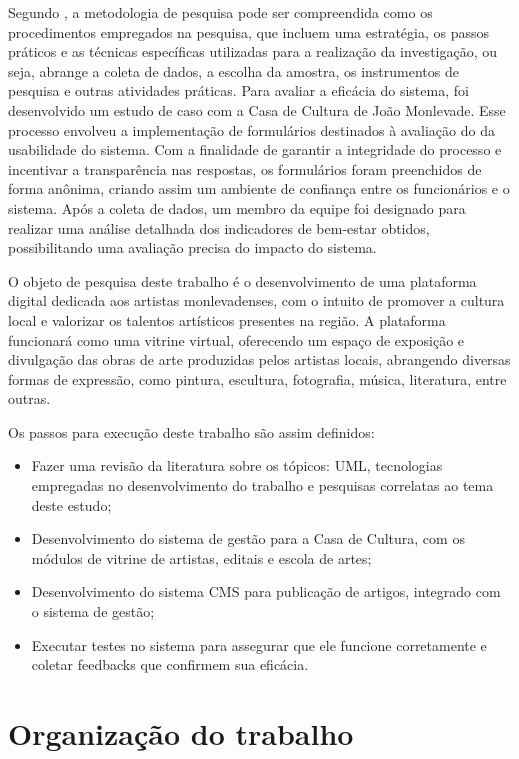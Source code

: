 Segundo \cite{moresi2003metodologia}, a metodologia de pesquisa pode ser compreendida como os procedimentos empregados na pesquisa, que incluem uma estratégia, os passos práticos e as técnicas específicas utilizadas para a realização da investigação, ou seja, abrange a coleta de dados, a escolha da amostra, os instrumentos de pesquisa e outras atividades práticas. Para avaliar a eficácia do sistema, foi desenvolvido um estudo de caso com a Casa de Cultura de João Monlevade. Esse processo envolveu a implementação de formulários destinados à avaliação do da usabilidade do sistema. Com a finalidade de garantir a integridade do processo e incentivar a transparência nas respostas, os formulários foram preenchidos de forma anônima, criando assim um ambiente de confiança entre os funcionários e o sistema. Após a coleta de dados, um membro da equipe foi designado para realizar uma análise detalhada dos indicadores de bem-estar obtidos, possibilitando uma avaliação precisa do impacto do sistema.

O objeto de pesquisa deste trabalho é o desenvolvimento de uma plataforma digital dedicada aos artistas monlevadenses, com o intuito de promover a cultura local e valorizar os talentos artísticos presentes na região. A plataforma funcionará como uma vitrine virtual, oferecendo um espaço de exposição e divulgação das obras de arte produzidas pelos artistas locais, abrangendo diversas formas de expressão, como pintura, escultura, fotografia, música, literatura, entre outras.

Os passos para execução deste trabalho são assim definidos:

\begin{itemize}
	\item Fazer uma revisão da literatura sobre os tópicos: \ac{UML}, tecnologias empregadas no desenvolvimento do trabalho e pesquisas correlatas ao tema deste estudo;
	\item Desenvolvimento do sistema de gestão para a Casa de Cultura, com os módulos de vitrine de artistas, editais e escola de artes;
	\item Desenvolvimento do sistema \ac{CMS} para publicação de artigos, integrado com o sistema de gestão;
	\item Executar testes no sistema para assegurar que ele funcione corretamente e coletar feedbacks que confirmem sua eficácia.
\end{itemize}

\section{Organização do trabalho}

